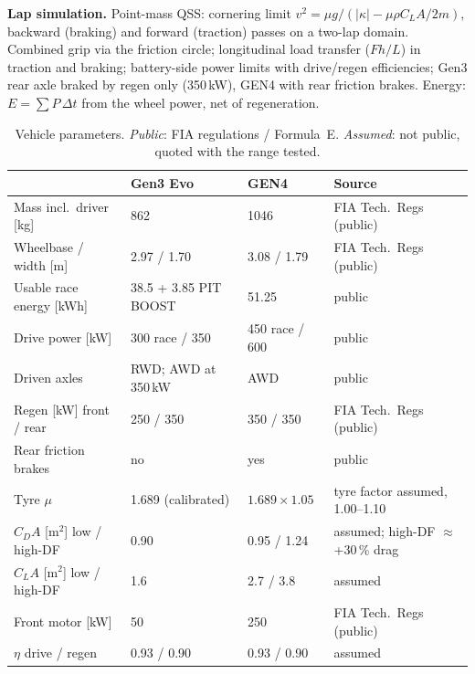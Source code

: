 \documentclass[10pt,a4paper]{article}
\begin{document}
\textbf{Lap simulation.} Point-mass QSS: cornering limit
$v^2 = \mu g / (|\kappa| - \mu\rho C_LA/2m)$, backward (braking) and forward (traction) passes on a
two-lap domain. Combined grip via the friction circle; longitudinal load transfer
($F h/L$) in traction and braking; battery-side power limits with drive/regen efficiencies;
Gen3 rear axle braked by regen only (350\,kW), GEN4 with rear friction brakes.
Energy: $E = \sum P\,\Delta t$ from the wheel power, net of regeneration.

\begin{table}[H]
\centering\small
\caption{Vehicle parameters. \emph{Public}: FIA regulations / Formula~E. \emph{Assumed}: not public, quoted with the range tested.}
\begin{tabular}{@{}llll@{}}
\toprule
 & Gen3 Evo & GEN4 & Source \\
\midrule
Mass incl.\ driver [kg]        & 862                & 1046                 & FIA Tech.\ Regs (public) \\
Wheelbase / width [m]          & 2.97 / 1.70        & 3.08 / 1.79          & FIA Tech.\ Regs (public) \\
Usable race energy [kWh]       & 38.5 + 3.85 PIT BOOST & 51.25             & public \\
Drive power [kW]               & 300 race / 350     & 450 race / 600       & public \\
Driven axles                   & RWD; AWD at 350\,kW & AWD                 & public \\
Regen [kW] front / rear        & 250 / 350          & 350 / 350            & FIA Tech.\ Regs (public) \\
Rear friction brakes           & no                 & yes                  & public \\
Tyre $\mu$                     & 1.689 (calibrated) & $1.689\times1.05$     & tyre factor assumed, 1.00--1.10 \\
$C_DA$ [m$^2$] low / high-DF   & 0.90               & 0.95 / 1.24          & assumed; high-DF $\approx$+30\,\% drag \\
$C_LA$ [m$^2$] low / high-DF   & 1.6                & 2.7 / 3.8            & assumed \\
Front motor [kW]               & 50                 & 250                  & FIA Tech.\ Regs (public) \\
$\eta$ drive / regen           & 0.93 / 0.90        & 0.93 / 0.90          & assumed \\
\bottomrule
\end{tabular}
\end{table}
\end{document}
